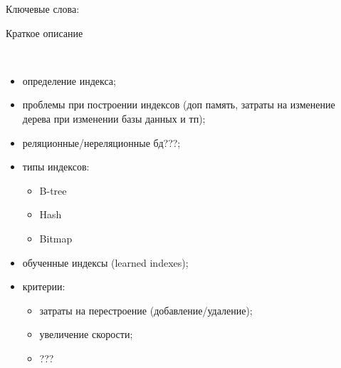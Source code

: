 \begin{essay}{}
    Ключевые слова:

    Краткое описание

    ~\\

    \vspace{-2mm}
    \begin{itemize}
        \item определение индекса;
        \item проблемы при построении индексов (доп память, затраты на изменение
            дерева при изменении базы данных и тп);
        \item реляционные/нереляционные бд???;
        \item типы индексов:
            \begin{itemize}
                \item B-tree
                \item Hash
                \item Bitmap
            \end{itemize}
        \item обученные индексы (learned indexes);
        \item критерии:
            \begin{itemize}
                \item затраты на перестроение (добавление/удаление);
                \item увеличение скорости;
                \item ???
            \end{itemize}
    \end{itemize}
\end{essay}
